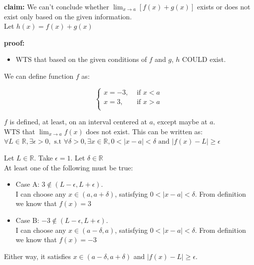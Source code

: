 \documentclass[12pt]{exam}
\newcommand {\DS} [1] {${\displaystyle #1}$}
\newcommand{\vv}{\vspace{.2cm}}
\newcommand{\R}{\mathbb{R}}
\begin{document}
\begin{enumerate}
\vv  

\textbf{claim: } We can't conclude whether \DS{\lim_{x \to a}\left[f(x) + g(x) \right]} exists or does not exist only based on the given information. \\
Let $h(x) = f(x) + g(x)$
\vv

\textbf{proof: } \\
	\begin{itemize}
		\item WTS that based on the given conditions of $f$ and $g$, $h$ COULD exist.
	\end{itemize}

We can define function $f$ as: 

$$
\begin{cases}
	x = -3, &\text{ if }x < a\\
	x = 3, &\text{ if } x > a\\
\end{cases}
$$

$f$ is defined, at least, on an interval centered at $a$, except maybe at $a$.\\

WTS that \DS{\lim_{x \to a} f(x)} does not exist.
This can be written as: $\forall L \in \R, \exists \epsilon > 0, \mbox{ s.t } \forall \delta > 0, \exists x \in \R,
 0 < |x - a| < \delta \mbox{ and } |f(x) - L| \geq \epsilon$

Let $L \in \R$. Take $\epsilon = 1$. Let $\delta \in \R$\\
At least one of the following must be true:

\begin{itemize}
	\item Case A: $3 \notin (L - \epsilon, L + \epsilon).$ \\ 
	I can choose any $x \in (a, a + \delta)$, satisfying $0 < |x - a| < \delta$. 
	From definition we know that $f(x) = 3$
\end{itemize}

\begin{itemize}
	\item Case B: $-3 \notin (L - \epsilon, L + \epsilon).$ \\ 
	I can choose any $x \in (a - \delta, a )$, satisfying $0 < |x - a| < \delta$. 
	From definition we know that $f(x) = -3$
\end{itemize}

Either way, it satisfies $x \in (a - \delta, a + \delta)$ and $|f(x) - L| \geq \epsilon$. \\



\end{enumerate}
\end{document}
